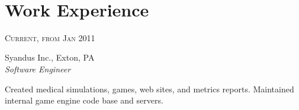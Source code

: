 \documentclass[10pt]{article} %
\begin{document}
\color{text1} %


\par{\\ %
	

\begin{minipage}[t]{0.5\textwidth} %
\vspace{0pt} %
	

\section{Work Experience} 


{\raggedleft\textsc{Current, from Jan 2011}\par}

{\raggedright\large Syandus Inc., Exton, PA\\
\textit{Software Engineer}\\[5pt]}

\normalsize{Created medical simulations, games, web sites, and metrics reports. Maintained internal game engine code base and servers.}\\


\end{minipage}}
\end{document}
